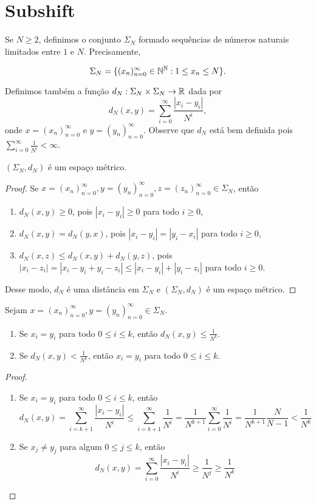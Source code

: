 \section{Subshift}

Se $N \geq 2$, definimos o conjunto $\Sigma_N$ formado sequências de números naturais limitados entre $1$ e $N$. Precisamente,

$$\Sigma_N = \{ (x_n)_{n=0}^{\infty} \in \mathbb{N}^{\mathbb{N}} : 1 \leq x_n \leq N \}.$$

Definimos também a função $d_N : \Sigma_N \times \Sigma_N \to \mathbb{R}$ dada por
$$d_N(x, y) = \sum_{i=0}^\infty \frac{|x_i - y_i|}{N^i},$$
onde $x = (x_n)_{n=0}^{\infty}$ e $y = (y_n)_{n=0}^{\infty}$. Observe que $d_N$ está bem definida pois $\sum_{i=0}^\infty \frac{1}{N^i} < \infty$.


\begin{proposition}
$(\Sigma_N, d_N)$ é um espaço métrico.
\end{proposition}


\begin{proof}
Se $x = (x_n)_{n=0}^{\infty}, y = (y_n)_{n=0}^{\infty}, z = (z_n)_{n=0}^{\infty} \in \Sigma_N$, então
\begin{enumerate}
\item $d_N(x, y) \geq 0$, pois $|x_i - y_i| \geq 0$ para todo $i \geq 0$,
\item $d_N(x, y) = d_N(y, x)$, pois $|x_i - y_i| = |y_i - x_i|$ para todo $i \geq 0$,
\item $d_N(x, z) \leq d_N(x, y) + d_N(y, z)$, pois $|x_i - z_i| = |x_i - y_i + y_i - z_i| \leq |x_i - y_i| + |y_i - z_i|$ para todo $i \geq 0$.
\end{enumerate}
Desse modo, $d_N$ é uma distância em $\Sigma_N$ e $(\Sigma_N, d_N)$ é um espaço métrico.
\end{proof}


\begin{proposition}
Sejam $x = (x_n)_{n=0}^{\infty}, y = (y_n)_{n=0}^{\infty} \in \Sigma_N$.
\begin{enumerate}
\item Se $x_i = y_i$ para todo $0 \leq i \leq k$, então $d_N(x, y) \leq \frac{1}{N^k}$.
\item Se $d_N(x, y) < \frac{1}{N^k}$, então $x_i = y_i$ para todo $0 \leq i \leq k$.
\end{enumerate}
\end{proposition}


\begin{proof}
\begin{enumerate}
\item Se $x_i = y_i$ para todo $0 \leq i \leq k$, então
$$d_N(x, y) = \sum_{i=k+1}^\infty \frac{|x_i - y_i|}{N^i} \leq \sum_{i=k+1}^\infty \frac{1}{N^i} = \frac{1}{N^{k+1}}\sum_{i=0}^\infty \frac{1}{N^{i}} = \frac{1}{N^{k+1}} \frac{N}{N - 1} < \frac{1}{N^k}$$

\item Se $x_j \neq y_j$ para algum $0 \leq j \leq k$, então
$$d_N(x, y) = \sum_{i=0}^\infty \frac{|x_i - y_i|}{N^i} \geq \frac{1}{N^j} \geq \frac{1}{N^k}$$
\end{enumerate}
\end{proof}


